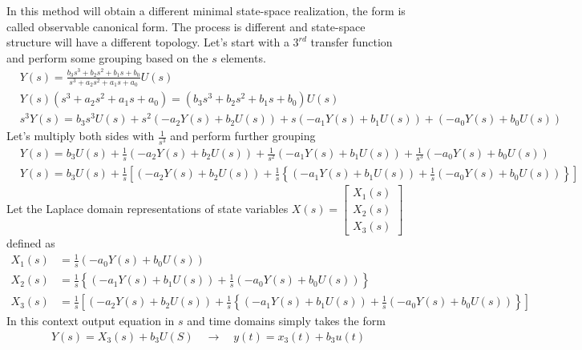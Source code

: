 \documentclass[twoside]{article}
\begin{document}
In this method will obtain a different minimal state-space realization,
the form is called observable canonical form.
The process is different and state-space structure will have a
different topology. Let's start with a $3^{rd}$ transfer function 
and perform some grouping based on the $s$ elements.
%
\begin{align*}
&Y(s) = \frac{ b_3 s^3 + b_2 s^2  + b_1 s + b_0 }{ s^3 + a_2 s^2 + a_1 s + a_0} U(s)
\\
&Y(s) \left( s^3 + a_2 s^2 + a_1 s + a_0 \right) = \left( b_3 s^3 + b_2 s^2  + b_1 s + b_0 \right) U(s)
\\
&s^3 Y(s) = b_3 s^3 U(s) + s^2 \left( -a_2 Y(s) + b_2 U(s) \right) + s \left( -a_1 Y(s) + b_1 U(s) \right) + 
\left( -a_0 Y(s) + b_0 U(s) \right) 
\end{align*}
%
Let's multiply both sides with $\frac{1}{s^3}$ and perform further grouping
%
\begin{align*}
&Y(s) = b_3 U(s) + \frac{1}{s} \left( -a_2 Y(s) + b_2 U(s) \right) + \frac{1}{s^2}  \left( -a_1 Y(s) + b_1 U(s) \right) + 
\frac{1}{s^3} \left( -a_0 Y(s) + b_0 U(s) \right) 
\\
&Y(s) = b_3 U(s) + \frac{1}{s} \left[ \left( -a_2 Y(s) + b_2 U(s) \right) + \frac{1}{s}  \left\lbrace \left( -a_1 Y(s) + b_1 U(s) \right) + 
\frac{1}{s} \left( -a_0 Y(s) + b_0 U(s) \right) \right\rbrace \right]
\end{align*}
%
Let the Laplace domain representations of state variables $X(s) = \left[ \begin{array}{c} X_1(s) \\ X_2(s) \\ X_3(s) \end{array} \right]$ defined as 
%
\begin{align*}
X_1(s) &= \frac{1}{s} \left( -a_0 Y(s) + b_0 U(s) \right)
\\
X_2(s) &= \frac{1}{s}  \left\lbrace \left( -a_1 Y(s) + b_1 U(s) \right) + 
\frac{1}{s} \left( -a_0 Y(s) + b_0 U(s) \right) \right\rbrace
\\
X_3(s) &= \frac{1}{s} \left[ \left( -a_2 Y(s) + b_2 U(s) \right) + \frac{1}{s}  \left\lbrace \left( -a_1 Y(s) + b_1 U(s) \right) + 
\frac{1}{s} \left( -a_0 Y(s) + b_0 U(s) \right) \right\rbrace \right]
\end{align*}
%
In this context output equation in $s$ and time domains simply takes the form
%
\begin{align*}
	Y(s) = X_3(s) + b_3 U(S) \quad \rightarrow \quad y(t) = x_3(t) + b_3 u(t)
\end{align*}
\end{document}
